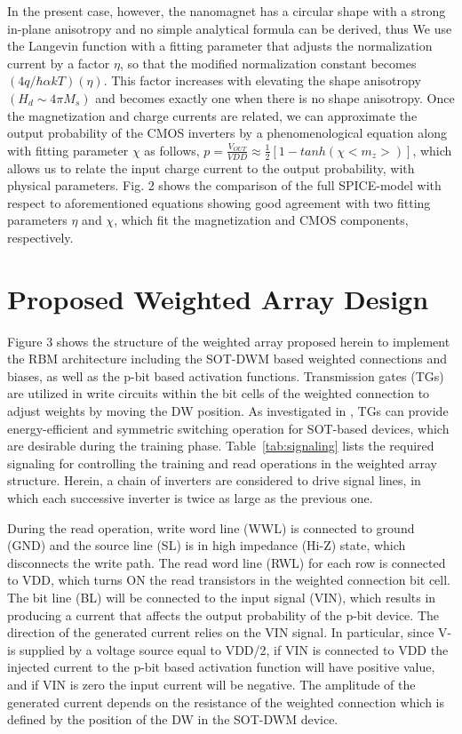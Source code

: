 In the present case, however, the nanomagnet has a circular shape with a strong in-plane anisotropy and no simple analytical formula can be derived, thus We use the Langevin function with a fitting parameter that adjusts the normalization current by a factor $\eta$, so that the modified normalization constant becomes $(4 q/\hbar \alpha kT)(\eta)$. This factor increases with elevating the shape anisotropy $(H_d \sim 4 \pi M_s)$ and becomes exactly one when there is no shape anisotropy. Once the magnetization and charge currents are related, we can approximate the output probability of the CMOS inverters by a phenomenological equation along with fitting parameter $\chi$ as follows, $p = \frac{V_{OUT}}{VDD} \approx \frac{1}{2} [1-tanh(\chi <m_z>)]$,   
which allows us to relate the input charge current to the output probability, with physical parameters.  Fig. 2 shows the comparison of the full SPICE-model with respect to aforementioned equations showing good agreement with two fitting parameters $\eta$ and $\chi$, which fit the magnetization and CMOS components, respectively. 




\section{Proposed Weighted Array Design}
Figure 3 shows the structure of the weighted array proposed herein to implement the RBM architecture including the SOT-DWM based weighted connections and biases, as well as the p-bit based activation functions. Transmission gates (TGs) are utilized in write circuits within the bit cells of the weighted connection to adjust weights by moving the DW position. As investigated in \cite{zand2017}, TGs can provide energy-efficient and symmetric switching operation for SOT-based devices, which are desirable during the training phase. Table~\ref{tab:signaling} lists the required signaling for controlling the training and read operations in the weighted array structure. Herein, a chain of inverters are considered to drive signal lines, in which each successive inverter is twice as large as the previous one.

During the read operation, write word line (WWL) is connected to ground (GND) and the source line (SL) is in high impedance (Hi-Z) state, which disconnects the write path. The read word line (RWL) for each row is connected to VDD, which turns ON the read transistors in the weighted connection bit cell. The bit line (BL) will be connected to the input signal (VIN), which results in producing a current that affects the output probability of the p-bit device. The direction of the generated current relies on the VIN signal. In particular, since V- is supplied by a voltage source equal to VDD/2, if VIN is connected to VDD the injected current to the p-bit based activation function will have positive value, and if VIN is zero the input current will be negative. The amplitude of the generated current depends on the resistance of the weighted connection which is defined by the position of the DW in the SOT-DWM device. 

